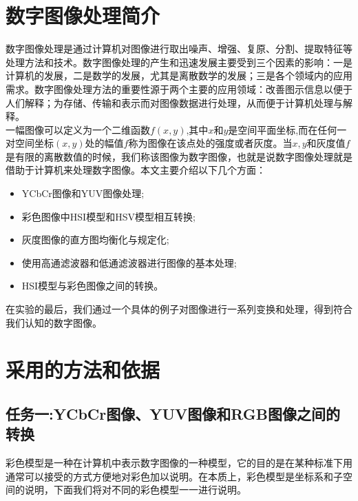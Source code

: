 \documentclass[UTF8,a4paper,10pt]{ctexart}
\begin{document}
    \begin{flushleft}
        \section{数字图像处理简介}
        \hspace{2em}数字图像处理是通过计算机对图像进行取出噪声、增强、复原、分割、提取特征等处理方法和技术。数字图像处理的产生和迅速发展主要受到三个因素的影响：一是计算机的发展，二是数学的发展，尤其是离散数学的发展；三是各个领域内的应用需求。数字图像处理方法的重要性源于两个主要的应用领域：改善图示信息以便于人们解释；为存储、传输和表示而对图像数据进行处理，从而便于计算机处理与解释。\\
        \hspace{2em}一幅图像可以定义为一个二维函数$f(x,y)$,其中$x$和$y$是空间平面坐标,而在任何一对空间坐标$(x,y)$处的幅值$f$称为图像在该点处的强度或者灰度。当$x,y$和灰度值$f$是有限的离散数值的时候，我们称该图像为数字图像，也就是说数字图像处理就是借助于计算机来处理数字图像。本文主要介绍以下几个方面：
        \begin{itemize}
            \item YCbCr图像和YUV图像处理;
            \item 彩色图像中HSI模型和HSV模型相互转换;
            \item 灰度图像的直方图均衡化与规定化;
            \item 使用高通滤波器和低通滤波器进行图像的基本处理;
            \item HSI模型与彩色图像之间的转换。
        \end{itemize}
        \hspace{2em}在实验的最后，我们通过一个具体的例子对图像进行一系列变换和处理，得到符合我们认知的数字图像。
        \section{采用的方法和依据}
        \subsection{任务一:YCbCr图像、YUV图像和RGB图像之间的转换}
        \hspace{2em}彩色模型是一种在计算机中表示数字图像的一种模型，它的目的是在某种标准下用通常可以接受的方式方便地对彩色加以说明。在本质上，彩色模型是坐标系和子空间的说明，下面我们将对不同的彩色模型一一进行说明。

\end{flushleft}
\end{document}
